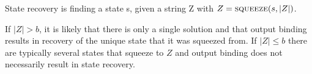 \begin{defn}
State recovery is finding a state s, given a string Z with $Z = \textsc{squeeze}(s, \vert Z\vert )$.
\end{defn}


If $\vert Z\vert > b$, it is likely that there is only a single solution and that output binding results in recovery of the unique state that it was squeezed from. If $\vert Z \vert \le b$ there are typically several states that squeeze to $Z$ and output binding does not necessarily result in state recovery.
